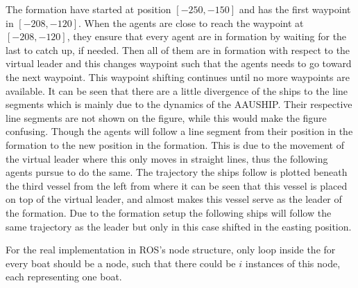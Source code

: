 The formation have started at position $[-250,-150]$ and has the first waypoint in $[-208,-120]$. When the agents are close to reach the waypoint at $[-208,-120]$, they ensure that every agent are in formation by waiting for the last to catch up, if needed. Then all of them are in formation with respect to the virtual leader and this changes waypoint such that the agents needs to go toward the next waypoint. This waypoint shifting continues until no more waypoints are available. It can be seen that there are a little divergence of the ships to the line segments which is mainly due to the dynamics of the AAUSHIP. Their respective line segments are not shown on the figure, while this would make the figure confusing. Though the agents will follow a line segment from their position in the formation to the new position in the formation. This is due to the movement of the virtual leader where this only moves in straight lines, thus the following agents pursue to do the same. The trajectory the ships follow is plotted beneath the third vessel from the left from where it can be seen that this vessel is placed on top of the virtual leader, and almost makes this vessel serve as the leader of the formation. Due to the formation setup the following ships will follow the same trajectory as the leader but only in this case shifted in the easting position.


For the real implementation in \ac{ROS}'s node structure, only loop
inside the for every boat should be a node, such that there could be
$i$ instances of this node, each representing one boat. 





